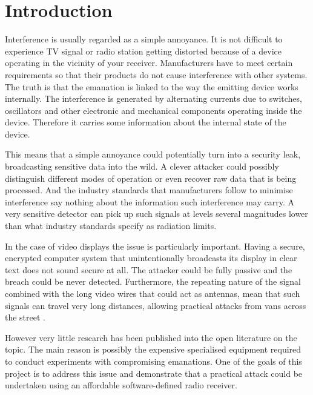 \documentclass[a4paper,12pt,twoside,openright]{report}
\begin{document}
\pagestyle{empty}
\singlespacing

\onehalfspacing

\singlespacing


\setcounter{page}{0}
\pagestyle{plain}
\tableofcontents

\onehalfspacing


\chapter{Introduction}
\setcounter{page}{1} 

Interference is usually regarded as a simple annoyance. It is not difficult to experience TV signal or radio station getting distorted because of a device operating in the vicinity of your receiver. Manufacturers have to meet certain requirements so that their products do not cause interference with other systems. The truth is that the emanation is linked to the way the emitting device works internally. The interference is generated by alternating currents due to switches, oscillators and other electronic and mechanical components operating inside the device. Therefore it carries some information about the internal state of the device.

This means that a simple annoyance could potentially turn into a security leak, broadcasting sensitive data into the wild. A clever attacker could possibly distinguish different modes of operation or even recover raw data that is being processed. And the industry standards that manufacturers follow to minimise interference say nothing about the information such interference may carry. A very sensitive detector can pick up such signals at levels several magnitudes lower than what industry standards specify as radiation limits.

In the case of video displays the issue is particularly important. Having a secure, encrypted computer system that unintentionally broadcasts its display in clear text does not sound secure at all. The attacker could be fully passive and the breach could be never detected. Furthermore, the repeating nature of the signal combined with the long video wires that could act as antennas, mean that such signals can travel very long distances, allowing practical attacks from vans across the street \cite{van1985electromagnetic}.

However very little research has been published into the open literature on the topic. The main reason is possibly the expensive specialised equipment required to conduct experiments with compromising emanations. One of the goals of this project is to address this issue and demonstrate that a practical attack could be undertaken using an affordable software-defined radio receiver.
\end{document}
